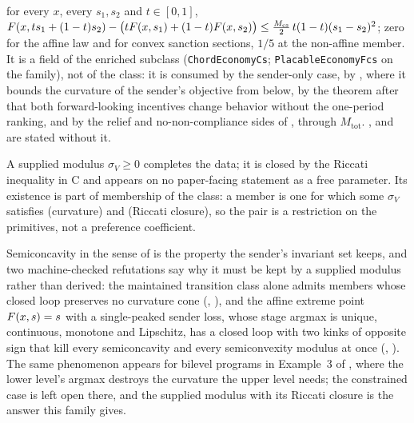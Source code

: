 \begin{enumerate}[label=(T\arabic*)]
for every $x$, every $s_1,s_2$ and $t\in[0,1]$,
$F(x,ts_1+(1-t)s_2)-\bigl(tF(x,s_1)+(1-t)F(x,s_2)\bigr)
\le\tfrac{M_{\mathrm{cs}}}2\,t(1-t)(s_1-s_2)^2$; zero for the affine law and
for convex sanction sections, $1/5$ at the non-affine member. It is a field
of the enriched subclass (\texttt{ChordEconomyCs}; \texttt{PlacableEconomyFcs}
on the family), not of the class:
it is consumed by the sender-only case, by , where it
bounds the curvature of
the sender's objective from below, by the theorem after 
that both forward-looking incentives change behavior without the one-period
ranking, and by the relief and no-non-compliance sides of
, through $M_{\mathrm{tot}}$. ,
 and  are stated
without it.
\end{enumerate}
A supplied modulus $\sigma_V\ge0$ completes the data; it is closed by the
Riccati inequality in C and appears on no paper-facing statement as a free
parameter. Its existence is part of membership of the class: a member is one for
which some $\sigma_V$ satisfies (curvature) and (Riccati closure), so the
pair is a restriction on the primitives, not a preference coefficient.
\begin{remark}
\label{rem:curvature-obstructions}
Semiconcavity in the sense of \citet{CannarsaSinestrari2004} is the property
the sender's invariant set keeps, and two machine-checked refutations say why it must
be kept by a supplied modulus rather than derived: the maintained transition
class alone admits members whose closed loop preserves no curvature cone
(,
), and the affine extreme
point $F(x,s)=s$ with a single-peaked sender loss, whose stage argmax is
unique, continuous, monotone and Lipschitz, has a closed loop with two kinks
of opposite sign that kill every semiconcavity and every semiconvexity modulus
at once (,
). The same phenomenon
appears for bilevel programs in Example~3 of \citet{ChenLiSo2025}, where the
lower level's argmax destroys the curvature the upper level needs; the
constrained case is left open there, and the supplied modulus with its
Riccati closure is the answer this family gives.
\end{remark}

